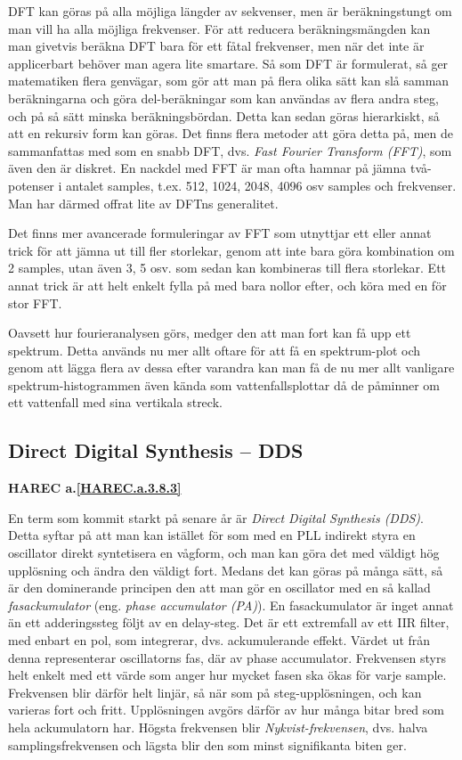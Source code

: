 DFT kan göras på alla möjliga längder av sekvenser, men är beräkningstungt
om man vill ha alla möjliga frekvenser.
För att reducera beräkningsmängden kan man givetvis beräkna DFT bara för ett
fåtal frekvenser, men när det inte är applicerbart behöver man agera lite
smartare.
Så som DFT är formulerat, så ger matematiken flera genvägar, som gör att man
på flera olika sätt kan slå samman beräkningarna och göra del-beräkningar som
kan användas av flera andra steg, och på så sätt minska beräkningsbördan.
Detta kan sedan göras hierarkiskt, så att en rekursiv form kan göras.
Det finns flera metoder att göra detta på, men de sammanfattas med som en
snabb DFT, dvs. \emph{Fast Fourier Transform (FFT)}, som även den är diskret.
En nackdel med FFT är man ofta hamnar på jämna två-potenser i antalet samples,
t.ex. 512, 1024, 2048, 4096 osv samples och frekvenser.
Man har därmed offrat lite av DFTns generalitet.

Det finns mer avancerade formuleringar av FFT som utnyttjar ett eller annat
trick för att jämna ut till fler storlekar, genom att inte bara göra
kombination om 2 samples, utan även 3, 5 osv. som sedan kan kombineras till
flera storlekar.
Ett annat trick är att helt enkelt fylla på med bara nollor efter, och köra
med en för stor FFT.

Oavsett hur fourieranalysen görs, medger den att man fort kan få upp ett
spektrum.
Detta används nu mer allt oftare för att få en spektrum-plot och genom att
lägga flera av dessa efter varandra kan man få de nu mer allt vanligare
spektrum-histogrammen även kända som vattenfallsplottar då de påminner om ett
vattenfall med sina vertikala streck.

\subsection{Direct Digital Synthesis -- DDS}
\textbf{HAREC a.\ref{HAREC.a.3.8.3}\label{myHAREC.a.3.8.3}}

En term som kommit starkt på senare år är \emph{Direct Digital Synthesis (DDS)}.
Detta syftar på att man kan istället för som med en PLL indirekt styra en
oscillator direkt syntetisera en vågform, och man kan göra det med väldigt
hög upplösning och ändra den väldigt fort.
Medans det kan göras på många sätt, så är den dominerande principen den att
man gör en oscillator med en så kallad \emph{fasackumulator} (eng. \emph{phase
 accumulator (PA)}).
En fasackumulator är inget annat än ett adderingssteg följt av en delay-steg.
Det är ett extremfall av ett IIR filter, med enbart en pol, som integrerar,
dvs. ackumulerande effekt.
Värdet ut från denna representerar oscillatorns fas, där av phase accumulator.
Frekvensen styrs helt enkelt med ett värde som anger hur mycket fasen ska
ökas för varje sample.
Frekvensen blir därför helt linjär, så när som på steg-upplösningen, och kan
varieras fort och fritt.
Upplösningen avgörs därför av hur många bitar bred som hela ackumulatorn har.
Högsta frekvensen blir \emph{Nykvist-frekvensen}, dvs. halva
samplingsfrekvensen och lägsta blir den som minst signifikanta biten ger.

